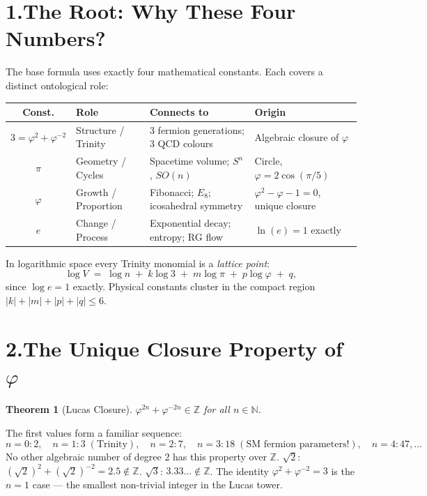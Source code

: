 \documentclass[12pt,a4paper]{article}
\newcommand{\ph}{\varphi}
\newtheorem{theorem}{Theorem}
\begin{document}
\section*{1.\quad The Root: Why These Four Numbers?}

The base formula uses exactly four mathematical constants.
Each covers a distinct ontological role:

\begin{center}\small
\begin{tabular}{clll}
\toprule
\textbf{Const.} & \textbf{Role} & \textbf{Connects to} & \textbf{Origin} \\
\midrule
$3 = \ph^2+\ph^{-2}$ & Structure / Trinity & 3 fermion generations; 3 QCD colours
  & Algebraic closure of $\ph$ \\
$\pi$ & Geometry / Cycles & Spacetime volume; $S^n$, $SO(n)$
  & Circle, $\ph=2\cos(\pi/5)$ \\
$\ph$ & Growth / Proportion & Fibonacci; $E_8$; icosahedral symmetry
  & $\ph^2-\ph-1=0$, unique closure \\
$e$ & Change / Process & Exponential decay; entropy; RG flow
  & $\ln(e)=1$ exactly \\
\bottomrule
\end{tabular}
\end{center}

\noindent
In logarithmic space every Trinity monomial is a \emph{lattice point}:
\[
  \log V \;=\; \log n \;+\; k\log 3 \;+\; m\log\pi \;+\; p\log\ph \;+\; q,
\]
since $\log e = 1$ exactly.
Physical constants cluster in the compact region $|k|+|m|+|p|+|q|\le 6$.

\section*{2.\quad The Unique Closure Property of $\ph$}

\begin{theorem}[Lucas Closure]
$\ph^{2n}+\ph^{-2n}\in\mathbb{Z}$ for all $n\in\mathbb{N}$.
\end{theorem}

The first values form a familiar sequence:
\[
n{=}0: 2,\quad
n{=}1: 3 \;(\text{Trinity}),\quad
n{=}2: 7,\quad
n{=}3: 18 \;(\text{SM fermion parameters!}),\quad
n{=}4: 47,\ldots
\]
No other algebraic number of degree 2 has this property over $\mathbb{Z}$.
$\sqrt{2}$: $(\sqrt{2})^2+(\sqrt{2})^{-2}=2.5 \notin\mathbb{Z}$.
$\sqrt{3}$: $3.33\ldots\notin\mathbb{Z}$.
The identity $\ph^2+\ph^{-2}=3$ is the $n=1$ case --- the smallest non-trivial
integer in the Lucas tower.
\end{document}
